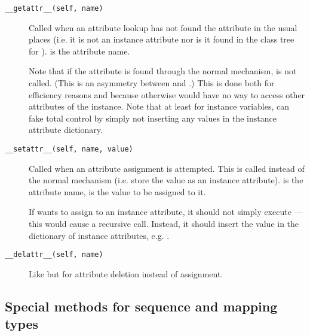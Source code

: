 \begin{description}

\item[{\tt __getattr__(self, name)}]
Called when an attribute lookup has not found the attribute in the
usual places (i.e. it is not an instance attribute nor is it found in
the class tree for ).   is the attribute name.

Note that if the attribute is found through the normal mechanism,
 is not called.  (This is an asymmetry between
 and .)
This is done both for efficiency reasons and because otherwise
 would have no way to access other attributes of the
instance.
Note that at least for instance variables,  can fake
total control by simply not inserting any values in the instance
attribute dictionary.

\item[{\tt __setattr__(self, name, value)}]
Called when an attribute assignment is attempted.  This is called
instead of the normal mechanism (i.e. store the value as an instance
attribute).   is the attribute name,  is the
value to be assigned to it.

If  wants to assign to an instance attribute, it
should not simply execute  --- this would
cause a recursive call.  Instead, it should insert the value in the
dictionary of instance attributes, e.g. .

\item[{\tt __delattr__(self, name)}]
Like  but for attribute deletion instead of
assignment.

\end{description}


\subsection{Special methods for sequence and mapping types}

